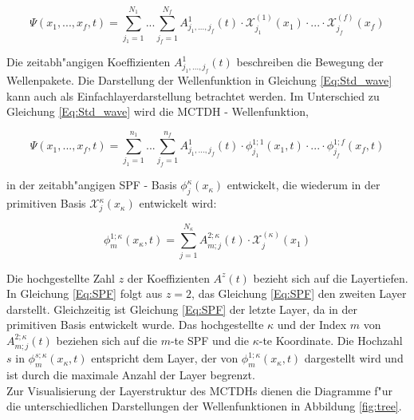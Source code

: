  \begin{equation}
 \Psi(x_{1},..., x_{f}, t)=\sum^{N_{1}}_{j_{1}=1} ... \sum^{N_{f}}_{j_{f}=1} A^{1}_{j_{1}, ..., j_{f}}(t)\cdot \mathcal{X}^{(1)}_{j_{1}}(x_{1}) \cdot ... \cdot \mathcal{X}^{(f)}_{j_{f}}(x_{f})
 \label{Eq:Std_wave}
 \end{equation}

Die zeitabh"angigen Koeffizienten $A^{1}_{j_{1}, ..., j_{f}}(t)$ beschreiben die Bewegung der Wellenpakete.
Die Darstellung der Wellenfunktion in Gleichung  \ref{Eq:Std_wave} kann auch als Einfachlayerdarstellung betrachtet werden.
Im Unterschied zu Gleichung \ref{Eq:Std_wave} wird die MCTDH - Wellenfunktion,

 \begin{equation}
 \Psi(x_{1},..., x_{f}, t)=\sum^{n_{1}}_{j_{1}=1} ... \sum^{n_{f}}_{j_{f}=1} A^{1}_{j_{1}, ..., j_{f}}(t)
 \cdot \phi^{1;1}_{j_{1}}(x_{1}, t) \cdot ... \cdot \phi^{1;f}_{j_{f}}(x_{f}, t)
 \label{Eq:mctdh_wave}
 \end{equation}

in der zeitabh"angigen SPF - Basis $\phi^{\kappa}_{j}(x_{\kappa})$ entwickelt, die wiederum in der primitiven Basis $\mathcal{X}^{\kappa}_{j}(x_{\kappa})$ entwickelt wird:

\begin{equation}
 \phi^{1;\kappa}_{m} (x_{\kappa}, t)=\sum^{N_{\kappa}}_{j=1} A^{2;\kappa}_{m;j}(t) \cdot \mathcal{X}^{(\kappa)}_{j}(x_{1})
 \label{Eq:SPF}
 \end{equation}

Die hochgestellte Zahl $z$ der Koeffizienten $A^{z}(t)$ bezieht sich auf die Layertiefen.
In Gleichung \ref{Eq:SPF} folgt aus $z=2$, das Gleichung \ref{Eq:SPF} den zweiten Layer darstellt.
Gleichzeitig ist Gleichung \ref{Eq:SPF} der letzte Layer, da in der primitiven Basis entwickelt wurde.
Das hochgestellte $\kappa$ und der Index $m$ von $A^{2;\kappa}_{m;j}(t)$ beziehen sich auf die $m$-te SPF und die $\kappa$-te Koordinate.
Die Hochzahl $s$ in $ \phi^{s;\kappa}_{m} (x_{\kappa}, t) $ entspricht dem Layer, der von $ \phi^{1;\kappa}_{m} (x_{\kappa}, t) $ dargestellt wird
und ist durch die maximale Anzahl der Layer begrenzt.
  \\Zur Visualisierung der Layerstruktur des MCTDHs dienen die Diagramme f"ur die unterschiedlichen Darstellungen der Wellenfunktionen in Abbildung \ref{fig:tree}.



